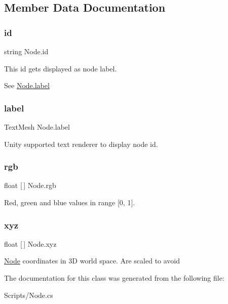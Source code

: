 \subsection{Member Data Documentation}
\mbox{\label{class_node_aac01078adae41d418df6d5e92e19093f}} 
\subsubsection{\texorpdfstring{id}{id}}
{\footnotesize\ttfamily string Node.\+id}



This id gets displayed as node label. 

See \mbox{\hyperlink{class_node_a6529bbce9a0d3a42b5738b7f338ff129}{Node.\+label}} \mbox{\label{class_node_a6529bbce9a0d3a42b5738b7f338ff129}} 
\subsubsection{\texorpdfstring{label}{label}}
{\footnotesize\ttfamily Text\+Mesh Node.\+label}



Unity supported text renderer to display node id. 

\mbox{\label{class_node_a72369fbc3dfe1c11ebef2d447454e0a6}} 
\subsubsection{\texorpdfstring{rgb}{rgb}}
{\footnotesize\ttfamily float \mbox{[}$\,$\mbox{]} Node.\+rgb}



Red, green and blue values in range \mbox{[}0, 1\mbox{]}. 

\mbox{\label{class_node_af9ab567cc411e1883e8466db9cca5bbc}} 
\subsubsection{\texorpdfstring{xyz}{xyz}}
{\footnotesize\ttfamily float \mbox{[}$\,$\mbox{]} Node.\+xyz}



\mbox{\hyperlink{class_node}{Node}} coordinates in 3D world space. Are scaled to avoid 



The documentation for this class was generated from the following file\+:\begin{DoxyCompactItemize}
\item 
Scripts/Node.\+cs\end{DoxyCompactItemize}
